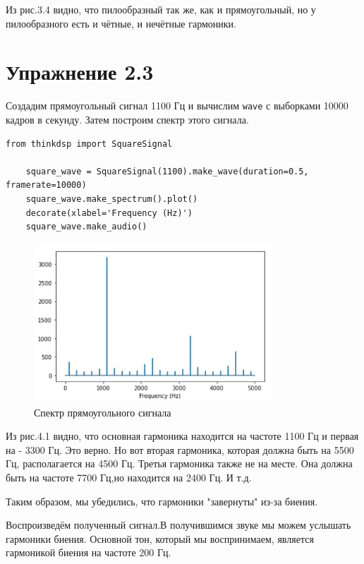 \documentclass[a4paper,12pt]{report}
\begin{document}
    Из рис.3.4 видно, что пилообразный так же, как и прямоугольный, но у пилообразного есть и чётные, и нечётные гармоники.

\chapter{Упражнение 2.3}
    Создадим прямоугольный сигнал 1100 Гц и вычислим \texttt{wave} с выборками 10000 кадров в секунду. Затем построим спектр этого сигнала.
\begin{lstlisting}[caption=Создание прямоугольного сигнала 1100 Гц]
    from thinkdsp import SquareSignal

    square_wave = SquareSignal(1100).make_wave(duration=0.5, framerate=10000)
    square_wave.make_spectrum().plot()
    decorate(xlabel='Frequency (Hz)')
    square_wave.make_audio()
\end{lstlisting}

\begin{figure}[H]
        \centering
        \includegraphics[width=0.8\textwidth]{fig4-1.PNG}
        \caption{Спектр прямоугольного сигнала}
        \label{fig:fig4-1}
\end{figure}    

    Из рис.4.1 видно, что основная гармоника находится на частоте 1100 Гц и первая на - 3300 Гц. Это верно. Но вот вторая гармоника, которая должна быть на 5500 Гц, располагается на 4500 Гц. Третья гармоника также не на месте. Она должна быть на частоте 7700 Гц,но находится на 2400 Гц. И т.д.
    
    Таким образом, мы убедились, что гармоники "завернуты" из-за биения.
    
    Воспроизведём полученный сигнал.В получившимся звуке мы можем услышать гармоники биения. Основной тон, который мы воспринимаем, является гармоникой биения на частоте 200 Гц. 
    
\end{document}
